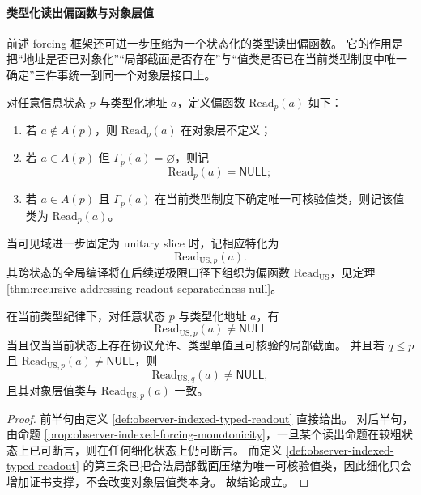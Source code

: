 \paragraph{类型化读出偏函数与对象层值}
前述 forcing 框架还可进一步压缩为一个状态化的类型读出偏函数。
它的作用是把“地址是否已对象化”“局部截面是否存在”与“值类是否已在当前类型制度中唯一确定”三件事统一到同一个对象层接口上。

\begin{definition}[类型化读出偏函数]\label{def:observer-indexed-typed-readout}
对任意信息状态 \(p\) 与类型化地址 \(a\)，定义偏函数 \(\mathrm{Read}_p(a)\) 如下：
\begin{enumerate}
  \item 若 \(a\notin A(p)\)，则 \(\mathrm{Read}_p(a)\) 在对象层不定义；
  \item 若 \(a\in A(p)\) 但 \(\Gamma_p(a)=\varnothing\)，则记
  \[
  \mathrm{Read}_p(a)=\mathsf{NULL};
  \]
  \item 若 \(a\in A(p)\) 且 \(\Gamma_p(a)\) 在当前类型制度下确定唯一可核验值类，则记该值类为 \(\mathrm{Read}_p(a)\)。
\end{enumerate}
当可见域进一步固定为 unitary slice 时，记相应特化为
\[
\mathrm{Read}_{\mathrm{US},p}(a).
\]
其跨状态的全局编译将在后续逆极限口径下组织为偏函数 \(\mathrm{Read}_{\mathrm{US}}\)，见定理 \ref{thm:recursive-addressing-readout-separatedness-null}。
\end{definition}

\begin{proposition}\label{prop:observer-indexed-readout-forcing-criterion}
在当前类型纪律下，对任意状态 \(p\) 与类型化地址 \(a\)，有
\[
\mathrm{Read}_{\mathrm{US},p}(a)\neq \mathsf{NULL}
\]
当且仅当当前状态上存在协议允许、类型单值且可核验的局部截面。
并且若 \(q\le p\) 且 \(\mathrm{Read}_{\mathrm{US},p}(a)\neq \mathsf{NULL}\)，则
\[
\mathrm{Read}_{\mathrm{US},q}(a)\neq \mathsf{NULL},
\]
且其对象层值类与 \(\mathrm{Read}_{\mathrm{US},p}(a)\) 一致。
\end{proposition}

\begin{proof}
前半句由定义 \ref{def:observer-indexed-typed-readout} 直接给出。
对后半句，由命题 \ref{prop:observer-indexed-forcing-monotonicity}，一旦某个读出命题在较粗状态上已可断言，则在任何细化状态上仍可断言。
而定义 \ref{def:observer-indexed-typed-readout} 的第三条已把合法局部截面压缩为唯一可核验值类，因此细化只会增加证书支撑，不会改变对象层值类本身。
故结论成立。
\end{proof}

